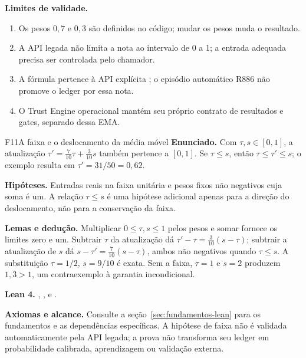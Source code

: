 \begin{aviso}
\textbf{Limites de validade.}
\begin{enumerate}[leftmargin=1.3em,itemsep=1pt]
  \item Os pesos $0{,}7$ e $0{,}3$ são definidos no código; mudar os pesos muda o resultado.
  \item A API legada não limita a nota ao intervalo de 0 a 1; a entrada adequada precisa ser controlada pelo chamador.
  \item A fórmula pertence à API explícita ; o episódio automático R886 não promove o ledger por essa nota.
  \item O Trust Engine operacional mantém seu próprio contrato de resultados e gates, separado dessa EMA.
\end{enumerate}
\end{aviso}

\begin{formalizacao}{F11}{A faixa e o deslocamento da média móvel}
\textbf{Enunciado.} Com $\tau,s\in[0,1]$, a atualização
$\tau'=\frac7{10}\tau+\frac3{10}s$ também pertence a $[0,1]$.
Se $\tau\leq s$, então $\tau\leq\tau'\leq s$; o exemplo resulta em
$\tau'=31/50=0{,}62$.

\textbf{Hipóteses.} Entradas reais na faixa unitária e pesos fixos não
negativos cuja soma é um. A relação $\tau\leq s$ é uma hipótese adicional
apenas para a direção do deslocamento, não para a conservação da faixa.

\textbf{Lemas e dedução.} Multiplicar $0\leq\tau,s\leq1$ pelos pesos e
somar fornece os limites zero e um. Subtrair $\tau$ da atualização dá
$\tau'-\tau=\frac3{10}(s-\tau)$; subtrair a atualização de $s$ dá
$s-\tau'=\frac7{10}(s-\tau)$, ambos não negativos quando $\tau\leq s$.
A substituição $\tau=1/2$, $s=9/10$ é exata. Sem a faixa, $\tau=1$ e
$s=2$ produzem $1{,}3>1$, um contraexemplo à garantia incondicional.

\textbf{Lean 4.} ,
,
 e
.

\textbf{Axiomas e alcance.} Consulte a seção~\ref{sec:fundamentos-lean}
para os fundamentos e as dependências específicas. A hipótese de faixa
não é validada automaticamente pela API legada; a prova não transforma
seu ledger em probabilidade calibrada, aprendizagem ou validação externa.
\end{formalizacao}


